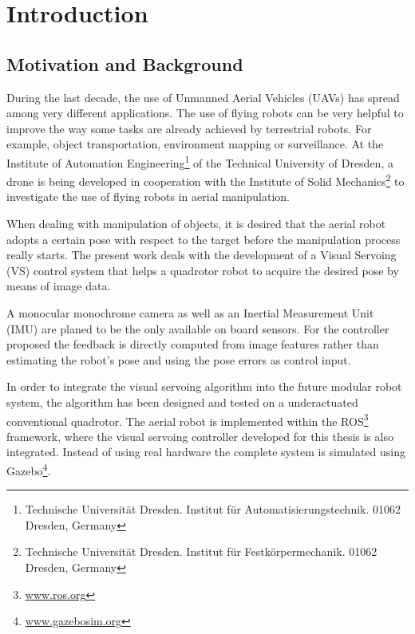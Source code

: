 
\chapter{Introduction}
\label{chap:introduction}

\section{Motivation and Background}
\label{sec:motivation-brackground}

During the last decade, the use of Unmanned Aerial Vehicles (UAVs) has spread among very different applications. The use of flying robots can be very helpful to improve the way some tasks are already achieved by terrestrial robots. For example, object transportation, environment mapping or surveillance. At the Institute of Automation Engineering\footnote{Technische Universität Dresden. Institut für Automatisierungstechnik. 01062 Dresden, Germany} of the Technical University of Dresden, a drone is being developed in cooperation with the Institute of Solid Mechanics\footnote{Technische Universität Dresden. Institut für Festkörpermechanik. 01062 Dresden, Germany} to investigate the use of flying robots in aerial manipulation.


When dealing with manipulation of objects, it is desired that the aerial robot adopts a certain pose with respect to the target before the manipulation process really starts. The present work deals with the development of a Visual Servoing (VS) control system that helps a quadrotor robot to acquire the desired pose by means of image data.


A monocular monochrome camera as well as an Inertial Measurement Unit (IMU) are planed to be the only available on board sensors. For the controller proposed the feedback is directly computed from image features rather than estimating the robot’s pose and using the pose errors as control input.


In order to integrate the visual servoing algorithm into the future modular robot system, the algorithm has been designed and tested on a underactuated conventional quadrotor. The aerial robot is implemented within the ROS\footnote{\url{www.ros.org}} framework, where the visual servoing controller developed for this thesis is also integrated. Instead of using real hardware the complete system is simulated using Gazebo\footnote{\url{ www.gazebosim.org}}.

